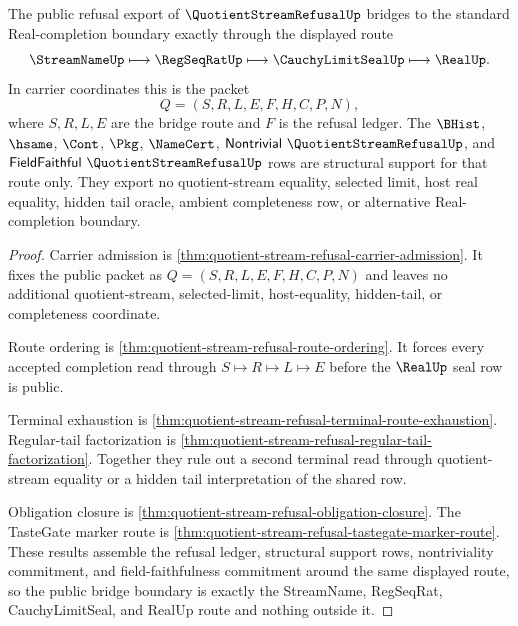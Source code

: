 \begin{theorem}
\label{thm:quotient-stream-refusal-public-bridge-boundary}
The public refusal export of $\QuotientStreamRefusalUp$ bridges to the standard Real-completion boundary exactly through the displayed route
$$
\StreamNameUp \longmapsto \RegSeqRatUp \longmapsto \CauchyLimitSealUp \longmapsto \RealUp.
$$
In carrier coordinates this is the packet
$$
Q=(S,R,L,E,F,H,C,P,N),
$$
where $S,R,L,E$ are the bridge route and $F$ is the refusal ledger. The $\BHist$, $\hsame$, $\Cont$, $\Pkg$, $\NameCert$, $\mathsf{Nontrivial}\ \QuotientStreamRefusalUp$, and $\mathsf{FieldFaithful}\ \QuotientStreamRefusalUp$ rows are structural support for that route only. They export no quotient-stream equality, selected limit, host real equality, hidden tail oracle, ambient completeness row, or alternative Real-completion boundary.
\end{theorem}
\begin{proof}
Carrier admission is \autoref{thm:quotient-stream-refusal-carrier-admission}. It fixes the public packet as $Q=(S,R,L,E,F,H,C,P,N)$ and leaves no additional quotient-stream, selected-limit, host-equality, hidden-tail, or completeness coordinate.

Route ordering is \autoref{thm:quotient-stream-refusal-route-ordering}. It forces every accepted completion read through $S \longmapsto R \longmapsto L \longmapsto E$ before the $\RealUp$ seal row is public.

Terminal exhaustion is \autoref{thm:quotient-stream-refusal-terminal-route-exhaustion}. Regular-tail factorization is \autoref{thm:quotient-stream-refusal-regular-tail-factorization}. Together they rule out a second terminal read through quotient-stream equality or a hidden tail interpretation of the shared row.

Obligation closure is \autoref{thm:quotient-stream-refusal-obligation-closure}. The TasteGate marker route is \autoref{thm:quotient-stream-refusal-tastegate-marker-route}. These results assemble the refusal ledger, structural support rows, nontriviality commitment, and field-faithfulness commitment around the same displayed route, so the public bridge boundary is exactly the StreamName, RegSeqRat, CauchyLimitSeal, and RealUp route and nothing outside it.
\end{proof}

